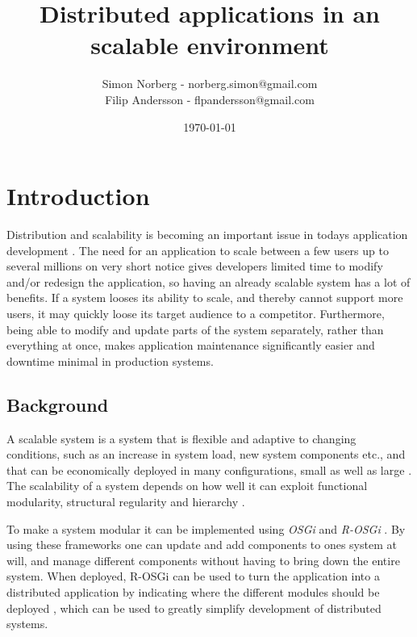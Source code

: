 \documentclass{article}
\begin{document}
 
\title{Distributed applications in an scalable environment}
\author{Simon Norberg - norberg.simon@gmail.com\\
        Filip Andersson - flpandersson@gmail.com }
\date{\today}
\maketitle
 
 
\section{Introduction}

Distribution and scalability is becoming an important issue in todays
application development \cite{rellermeyer2007services}.
The need for an application to scale between a few users up to several millions 
on very short notice gives developers limited time to modify and/or redesign 
the application, so having an already scalable system has a lot of benefits. 
If a system looses its ability to scale, and thereby cannot support more users, 
it may quickly loose its target audience to a competitor. Furthermore, being able 
to modify and update parts of the system separately, rather than everything at 
once, makes application maintenance significantly easier and downtime minimal 
in production systems.

\subsection{Background}

A scalable system is a system that is flexible and adaptive to changing
conditions, such as an increase in system load, new system components etc., and
that can be economically deployed in many configurations, small as well as
large \cite{jogalekar2000evaluating}. The scalability of a system depends on
how well it can exploit functional modularity, structural regularity and
hierarchy \cite{lipson2007principles}.

To make a system modular it can be implemented using \emph{OSGi} and
\emph{R-OSGi} \cite{rellermeyer2007services}. By using these frameworks one can
update and add components to ones system at will, and manage different
components without having to bring down the entire system. When deployed,
R-OSGi can be used to turn the application into a distributed application by
indicating where the different modules should be deployed
\cite{rellermeyer2007r}, which can be used to greatly simplify development of
distributed systems.
\end{document}
